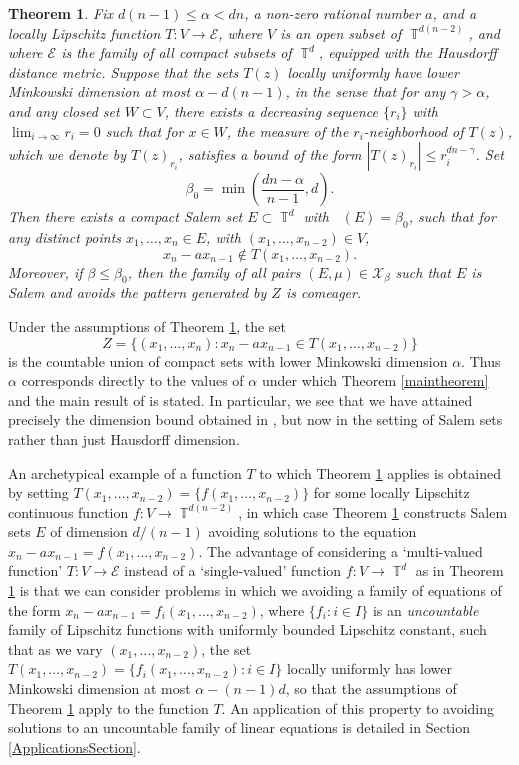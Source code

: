 \documentclass[dvipsnames,letterpaper,12pt]{article}
\numberwithin{equation}{section}
\DeclareMathOperator{\fordim}{\dim_{\mathbb{F}}}
\DeclareMathOperator{\TT}{\mathbb{T}}
\newtheorem{theorem}{Theorem}
\numberwithin{theorem}{section}
\begin{document}
\begin{theorem} \label{thirdTheorem}
    Fix $d(n-1) \leq \alpha < dn$, a non-zero rational number $a$, and a locally Lipschitz function $T: V \to \mathcal{E}$, where $V$ is an open subset of $\TT^{d(n-2)}$, and where $\mathcal{E}$ is the family of all compact subsets of $\TT^d$, equipped with the Hausdorff distance metric. Suppose that the sets $T(z)$ \emph{locally uniformly} have lower Minkowski dimension at most $\alpha - d(n-1)$, in the sense that for any $\gamma > \alpha$, and any closed set $W \subset V$, there exists a decreasing sequence $\{ r_i \}$ with $\lim_{i \to \infty} r_i = 0$ such that for $x \in W$, the measure of the $r_i$-neighborhood of $T(z)$, which we denote by $T(z)_{r_i}$, satisfies a bound of the form $|T(z)_{r_i}| \leq r_i^{dn-\gamma}$. Set
    \[ \beta_0 = \min \left( \frac{dn - \alpha}{n-1}, d \right). \]
    Then there exists a compact Salem set $E \subset \TT^d$ with $\fordim(E) = \beta_0$, such that for any distinct points $x_1,\dots,x_n \in E$, with $(x_1,\dots,x_{n-2}) \in V$,
    \[ x_n - a x_{n-1} \not \in T(x_1,\dots,x_{n-2}). \]
    Moreover, if $\beta \leq \beta_0$, then the family of all pairs $(E,\mu) \in \mathcal{X}_\beta$ such that $E$ is Salem and avoids the pattern generated by $Z$ is comeager.
\end{theorem}

Under the assumptions of Theorem \ref{thirdTheorem}, the set
%
\[ Z = \{ (x_1,\dots,x_n): x_n - ax_{n-1} \in T(x_1,\dots,x_{n-2}) \} \]
%
is the countable union of compact sets with lower Minkowski dimension $\alpha$. Thus $\alpha$ corresponds directly to the values of $\alpha$ under which Theorem \ref{maintheorem} and the main result of \cite{OurPaper} is stated. In particular, we see that we have attained precisely the dimension bound obtained in \cite{OurPaper}, but now in the setting of Salem sets rather than just Hausdorff dimension.

An archetypical example of a function $T$ to which Theorem \ref{thirdTheorem} applies is obtained by setting $T(x_1,\dots,x_{n-2}) = \{ f(x_1,\dots,x_{n-2}) \}$ for some locally Lipschitz continuous function $f: V \to \TT^{d(n-2)}$, in which case Theorem \ref{thirdTheorem} constructs Salem sets $E$ of dimension $d/(n-1)$ avoiding solutions to the equation $x_n - a x_{n-1} = f(x_1,\dots,x_{n-2})$. The advantage of considering a `multi-valued function' $T: V \to \mathcal{E}$ instead of a `single-valued' function $f: V \to \TT^d$ as in Theorem \ref{thirdTheorem} is that we can consider problems in which we avoiding a family of equations of the form $x_n - ax_{n-1} = f_i(x_1,\dots,x_{n-2})$, where $\{ f_i : i \in I \}$ is an \emph{uncountable} family of Lipschitz functions with uniformly bounded Lipschitz constant, such that as we vary $(x_1,\dots,x_{n-2})$, the set $T(x_1,\dots,x_{n-2}) = \{ f_i(x_1,\dots,x_{n-2}) : i \in I \}$ locally uniformly has lower Minkowski dimension at most $\alpha - (n-1)d$, so that the assumptions of Theorem \ref{thirdTheorem} apply to the function $T$. An application of this property to avoiding solutions to an uncountable family of linear equations is detailed in Section \ref{ApplicationsSection}.
\end{document}
